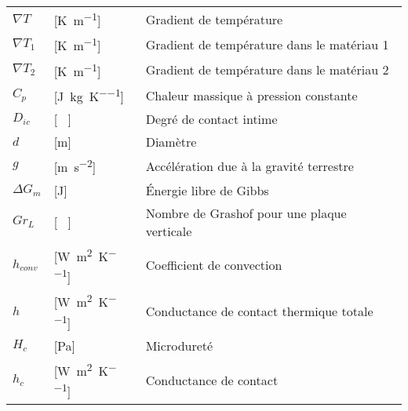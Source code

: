 \begin{longtable}{l p{2.5cm} p{4in}}
	$\nabla T$        & [\si{\kelvin\per\metre}]                            & Gradient de température                                                               \\
	$\nabla T_1$      & [\si{\kelvin\per\metre}]                            & Gradient de température dans le matériau 1                                            \\
	$\nabla T_2$      & [\si{\kelvin\per\metre}]                            & Gradient de température dans le matériau 2                                            \\
	$C_p$             & [\si{\joule\per\kilogram\per\kelvin}]               & Chaleur massique à pression constante                                                 \\
	$D_{ic}$          & [ \ ]                                               & Degré de contact intime                                                               \\
	$d$               & [\si{\metre}]                                       & Diamètre                                                                              \\
	$g$               & [\si{\metre\per\square\second}]                     & Accélération due à la gravité terrestre                                               \\
	$\Delta G_m$      & [\si{\joule}]                                       & Énergie libre de Gibbs                                                                \\
	$Gr_L$            & [ \ ]                                               & Nombre de Grashof pour une plaque verticale                                           \\
	$h_{conv}$        & [\si{\watt\per\square\metre\per\kelvin}]            & Coefficient de convection                                                             \\
	$h$               & [\si{\watt\per\square\metre\per\kelvin}]            & Conductance de contact thermique totale                                               \\
	$H_c$             & [\si{\pascal}]                                      & Microdureté                                                                           \\
	$h_c$             & [\si{\watt\per\square\metre\per\kelvin}]            & Conductance de contact                                                                \\

\end{longtable}
